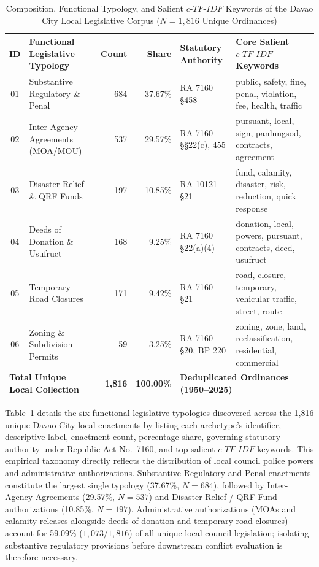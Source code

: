 \begin{table}[!htbp]
    \centering
    \footnotesize
    \renewcommand{\arraystretch}{0.92}
    \setlength{\tabcolsep}{3.2pt}
    \caption[Functional Typology of the Davao City Local Legislative Corpus]{Composition, Functional Typology, and Salient $c\text{-}TF\text{-}IDF$ Keywords of the Davao City Local Legislative Corpus ($N = 1{,}816$ Unique Ordinances)}
    \label{tab:local_typology_composition}
    \begin{tabularx}{\linewidth}{c>{\RaggedRight}p{3.8cm}rr>{\RaggedRight}p{2.2cm}>{\RaggedRight}X}
        \toprule
        \textbf{ID} & \textbf{Functional Legislative Typology} & \textbf{Count} & \textbf{Share} & \textbf{Statutory Authority} & \textbf{Core Salient $c\text{-}TF\text{-}IDF$ Keywords} \\
        \midrule
        01 & Substantive Regulatory \& Penal & 684 & 37.67\% & RA 7160 \S458 & public, safety, fine, penal, violation, fee, health, traffic \\
        02 & Inter-Agency Agreements (MOA/MOU) & 537 & 29.57\% & RA 7160 \S\S22(c), 455 & pursuant, local, sign, panlungsod, contracts, agreement \\
        03 & Disaster Relief \& QRF Funds & 197 & 10.85\% & RA 10121 \S21 & fund, calamity, disaster, risk, reduction, quick response \\
        04 & Deeds of Donation \& Usufruct & 168 & 9.25\% & RA 7160 \S22(a)(4) & donation, local, powers, pursuant, contracts, deed, usufruct \\
        05 & Temporary Road Closures & 171 & 9.42\% & RA 7160 \S21 & road, closure, temporary, vehicular traffic, street, route \\
        06 & Zoning \& Subdivision Permits & 59 & 3.25\% & RA 7160 \S20, BP 220 & zoning, zone, land, reclassification, residential, commercial \\
        \midrule
        \multicolumn{2}{l}{\textbf{Total Unique Local Collection}} & \textbf{1,816} & \textbf{100.00\%} & \multicolumn{2}{l}{\textbf{Deduplicated Ordinances (1950--2025)}} \\
        \bottomrule
    \end{tabularx}
\end{table}

Table~\ref{tab:local_typology_composition} details the six functional legislative typologies discovered across the 1,816 unique Davao City local enactments by listing each archetype's identifier, descriptive label, enactment count, percentage share, governing statutory authority under Republic Act No.~7160, and top salient $c\text{-}TF\text{-}IDF$ keywords. This empirical taxonomy directly reflects the distribution of local council police powers and administrative authorizations. Substantive Regulatory and Penal enactments constitute the largest single typology (37.67\%, $N=684$), followed by Inter-Agency Agreements (29.57\%, $N=537$) and Disaster Relief / QRF Fund authorizations (10.85\%, $N=197$). Administrative authorizations (MOAs and calamity releases alongside deeds of donation and temporary road closures) account for 59.09\% ($1{,}073/1{,}816$) of all unique local council legislation; isolating substantive regulatory provisions before downstream conflict evaluation is therefore necessary.

